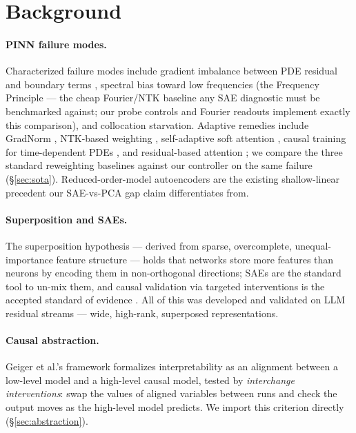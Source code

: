\documentclass{article}
\begin{document}
\section{Background}
\label{sec:background}

\paragraph{PINN failure modes.} Characterized failure modes include
gradient imbalance between PDE residual and boundary terms
\cite{wang2020understanding,krishnapriyan2021characterizing}, spectral bias
toward low frequencies (the Frequency Principle
\cite{xu2019frequency,rahaman2019spectral} — the cheap Fourier/NTK baseline
any SAE diagnostic must be benchmarked against; our probe controls and
Fourier readouts implement exactly this comparison), and collocation
starvation. Adaptive remedies include GradNorm \cite{chen2018gradnorm},
NTK-based weighting \cite{wang2021learning}, self-adaptive soft attention
\cite{mccclenny2023self}, causal training for time-dependent PDEs
\cite{wang2024respecting}, and residual-based attention
\cite{anagnostopoulos2024residual}; we compare the three standard
reweighting baselines against our controller on the same failure
(\S\ref{sec:sota}). Reduced-order-model autoencoders
\cite{kim2022fast} are the existing shallow-linear precedent our
SAE-vs-PCA gap claim differentiates from.

\paragraph{Superposition and SAEs.} The superposition hypothesis
\cite{elbage2022toy,chen2023toy} — derived from sparse, overcomplete,
unequal-importance feature structure — holds that networks store more
features than neurons by encoding them in non-orthogonal directions; SAEs
\cite{cunningham2023sparse,bricken2023towards,gao2025scaling} are the
standard tool to un-mix them, and causal validation via targeted
interventions is the accepted standard of evidence
\cite{marks2025sparse,wu2025axbench}. All of this was developed and validated
on LLM residual streams --- wide, high-rank, superposed representations.

\paragraph{Causal abstraction.} Geiger et al.'s framework
\cite{geiger2021causal,geiger2022inducing} formalizes interpretability as an
alignment between a low-level model and a high-level causal model, tested by
\emph{interchange interventions}: swap the values of aligned variables
between runs and check the output moves as the high-level model predicts. We
import this criterion directly (\S\ref{sec:abstraction}).
\end{document}
